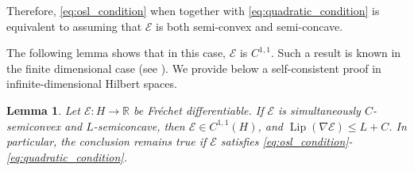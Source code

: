 \documentclass[12pt]{amsart}
\numberwithin{equation}{section}
\newtheorem{lemma}[theorem]{Lemma}
\begin{document}
Therefore, \eqref{eq:osl_condition} when together with \eqref{eq:quadratic_condition} is equivalent to assuming that $\mathscr{E}$ is both semi-convex and semi-concave. 

The following lemma shows that in this case, $\mathscr{E}$ is $C^{1,1}$. Such a result is known in the finite dimensional case (see \cite[Corollary 3.3.8, p.61]{cannarsa2004semiconcave}). We provide below a self-consistent proof in infinite-dimensional Hilbert spaces.  


\begin{lemma}
Let $\mathscr{E}:H\to\mathbb R$ be Fr\'echet differentiable. If $\mathscr{E}$ is simultaneously $C$-semiconvex and $L$-semiconcave, then $\mathscr{E}\in C^{1,1}(H)$,  and $\operatorname{Lip}(\nabla\mathscr{E}) \le L+C$. In particular, the conclusion remains true if $\mathscr{E}$ satisfies \eqref{eq:osl_condition}-\eqref{eq:quadratic_condition}.
\end{lemma}
\end{document}

